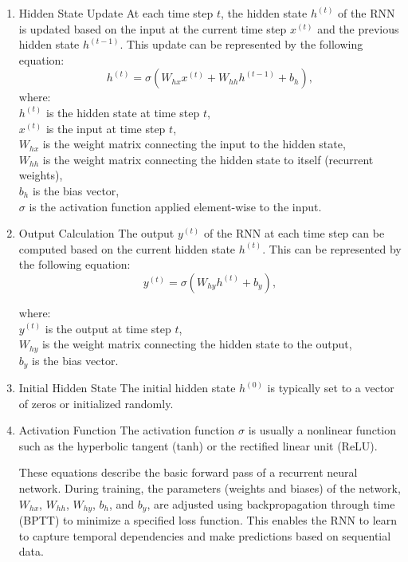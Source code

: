\documentclass[12pt]{article}
\begin{document}
    \begin{enumerate}
    \item Hidden State Update
       At each time step \( t \), the hidden state \( h^{(t)} \) of the RNN is updated
       based on the input at the current time step \( x^{(t)} \) and the previous hidden
       state \( h^{(t-1)} \). This update can be represented by the following equation:
       \begin{equation}
        h^{(t)} = \sigma(W_{hx} x^{(t)} + W_{hh} h^{(t-1)} + b_h),
       \end{equation}
       where:\\
       \( h^{(t)} \) is the hidden state at time step \( t \),\\
       \( x^{(t)} \) is the input at time step \( t \),\\
       \( W_{hx} \) is the weight matrix connecting the input to the hidden state,\\
       \( W_{hh} \) is the weight matrix connecting the hidden state to itself (recurrent weights),\\
       \( b_h \) is the bias vector,\\
       \( \sigma \) is the activation function applied element-wise to the input.
    
    \item Output Calculation
       The output \( y^{(t)} \) of the RNN at each time step can be computed based on the
       current hidden state \( h^{(t)} \). This can be represented by the following equation:
       \begin{equation}
        y^{(t)} = \sigma(W_{hy} h^{(t)} + b_y),
       \end{equation}
    
       where:\\
       \( y^{(t)} \) is the output at time step \( t \),\\
       \( W_{hy} \) is the weight matrix connecting the hidden state to the output,\\
       \( b_y \) is the bias vector.
    
    \item Initial Hidden State
       The initial hidden state \( h^{(0)} \) is typically set to a vector of zeros or initialized randomly.
    
    \item Activation Function
       The activation function \( \sigma \) is usually a nonlinear function such as the hyperbolic tangent (tanh) or the rectified linear unit (ReLU).
    
    These equations describe the basic forward pass of a recurrent neural network. During training, the parameters (weights and biases) of the network, \( W_{hx} \), \( W_{hh} \), \( W_{hy} \), \( b_h \), and \( b_y \), are adjusted using backpropagation through time (BPTT) to minimize a specified loss function. This enables the RNN to learn to capture temporal dependencies and make predictions based on sequential data.
    \end{enumerate}
\end{document}
